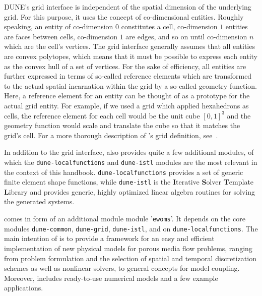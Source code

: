 DUNE's grid interface is independent of the spatial dimension of the
underlying grid. For this purpose, it uses the concept of
co-dimensional entities. Roughly speaking, an entity of co-dimension
$0$ constitutes a cell, co-dimension $1$ entities are faces between
cells, co-dimension $1$ are edges, and so on until co-dimension $n$
which are the cell's vertices.  The \Dune grid interface generally
assumes that all entities are convex polytopes, which means that it
must be possible to express each entity as the convex hull of a set of
vertices. For the sake of efficiency, all entities are further expressed in terms
of so-called reference elements which are transformed to the actual
spatial incarnation within the grid by a so-called geometry
function. Here, a reference element for an
entity can be thought of as a prototype for the actual grid
entity. For example, if we used a grid which applied hexahedrons as cells,
the reference element for each cell would be the unit cube $[0, 1]^3$
and the geometry function would scale and translate the cube so that
it matches the grid's cell. For a more thorough description of \Dune's
grid definition, see~\cite{BASTIAN2008}.

In addition to the grid interface, \Dune also provides quite a few
additional modules, of which the \texttt{dune-localfunctions} and
\texttt{dune-istl} modules are the most relevant in the context of
this handbook. \texttt{dune-localfunctions} provides a set of generic
finite element shape functions, while \texttt{dune-istl} is the
\textbf{I}terative \textbf{S}olver \textbf{T}emplate \textbf{L}ibrary
and provides generic, highly optimized linear algebra routines for
solving the generated systems.

\eWoms comes in form of an additional module \Dune module
'\texttt{ewoms}'.  It depends on the \Dune core modules
\texttt{dune-common}, \texttt{dune-grid}, \texttt{dune-istl}, and on
\texttt{dune-localfunctions}.  The main intention of \eWoms is to
provide a framework for an easy and efficient implementation of new
physical models for porous media flow problems, ranging from problem
formulation and the selection of spatial and temporal discretization
schemes as well as nonlinear solvers, to general concepts for model
coupling.  Moreover, \eWoms includes ready-to-use numerical models and
a few example applications.

